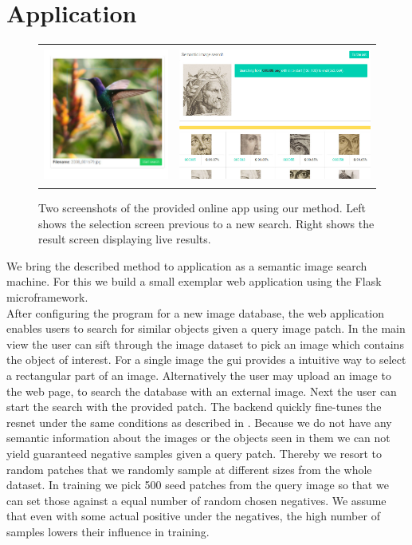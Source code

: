 %
\chapter{Application}
\label{sec:application}
\begin{figure}[h!]
    \centering
    \begin{tabulary}{\textwidth}{cc}
        \includegraphics[height=4.5cm]{figures/server_select} &
        \includegraphics[height=4.5cm]{figures/server_results}
    \end{tabulary}
    \caption{Two screenshots of the provided online app using our method. Left shows the selection screen previous to a new search. Right shows the result screen displaying live results.}
    \label{fig:application}
\end{figure}
We bring the described method to application as a semantic image search machine. For this we build a small exemplar web application using the Flask microframework.\\
After configuring the program for a new image database, the web application enables users to search for similar objects given a query image patch. In the main view the user can sift through the image dataset to pick an image which contains the object of interest. For a single image the \gls{gui} provides a intuitive way to select a rectangular part of an image. Alternatively the user may upload an image to the web page, to search the database with an external image. Next the user can start the search with the provided patch. The backend quickly fine-tunes the \gls{resnet} under the same conditions as described in . Because we do not have any semantic information about the images or the objects seen in them we can not yield guaranteed negative samples given a query patch. Thereby we resort to random patches that we randomly sample at different sizes from the whole dataset. In training we pick 500 seed patches from the query image so that we can set those against a equal number of random chosen negatives. We assume that even with some actual positive under the negatives, the high number of samples lowers their influence in training.\\
